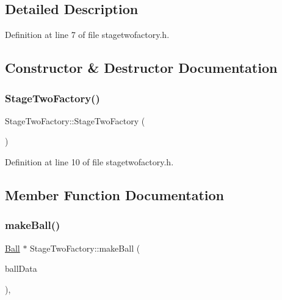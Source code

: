 \subsection{Detailed Description}


Definition at line 7 of file stagetwofactory.\+h.



\subsection{Constructor \& Destructor Documentation}
\mbox{\label{class_stage_two_factory_acac1c74cee2fc4a3fea6b59dc60cb0eb}} 
\subsubsection{\texorpdfstring{Stage\+Two\+Factory()}{StageTwoFactory()}}
{\footnotesize\ttfamily Stage\+Two\+Factory\+::\+Stage\+Two\+Factory (\begin{DoxyParamCaption}{ }\end{DoxyParamCaption})\hspace{0.3cm}{\ttfamily [inline]}}



Definition at line 10 of file stagetwofactory.\+h.



\subsection{Member Function Documentation}
\mbox{\label{class_stage_two_factory_aa12e02122eea28b08b3e148521bc2055}} 
\subsubsection{\texorpdfstring{make\+Ball()}{makeBall()}}
{\footnotesize\ttfamily \mbox{\hyperlink{class_ball}{Ball}} $\ast$ Stage\+Two\+Factory\+::make\+Ball (\begin{DoxyParamCaption}\item[{const Q\+Json\+Object \&}]{ball\+Data }\end{DoxyParamCaption})\hspace{0.3cm}{\ttfamily [override]}, {\ttfamily [virtual]}}



